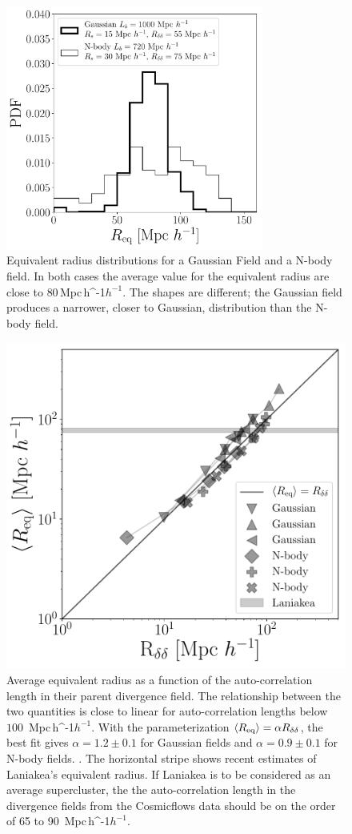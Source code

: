 \documentclass[usenatbib]{mnras}
\newcommand{\Mpch}{\,{\rm Mpc}\,\ifmmode h^{-1}\else $h^{-1}$\fi}
\begin{document}
 
\begin{figure}
    \centering
    \includegraphics[width=240pt]{sizes_histogram.pdf}
    \caption{Equivalent radius distributions for a Gaussian Field and a N-body field.
    In both cases the average value for the equivalent radius are close to $80$\Mpch. 
    The shapes are different; the Gaussian field produces a narrower, closer to Gaussian, distribution than the N-body field. }  
    \label{fig:Nclusters}
\end{figure}


\begin{figure}
    \centering
    \includegraphics[width=330pt]{summary_watershed.pdf}
    \caption{Average equivalent radius as a function of the auto-correlation length in their parent divergence field.
    The relationship between the two quantities is close to linear for auto-correlation lengths below $100$ \Mpch. With the parameterization $\langle R_{\rm{eq}}\rangle=\alpha R_{\delta\delta}$, the best fit gives $\alpha=1.2\pm0.1$ for Gaussian fields and $\alpha=0.9\pm 0.1$ for N-body fields.
    \label{fig:Nclusters}.
    The horizontal stripe shows recent estimates of Laniakea's equivalent radius. If Laniakea is to be considered as an average supercluster, the the auto-correlation length in the divergence fields from the Cosmicflows data should be on the order of 65 to 90 \Mpch.}
\end{figure}
\end{document}
